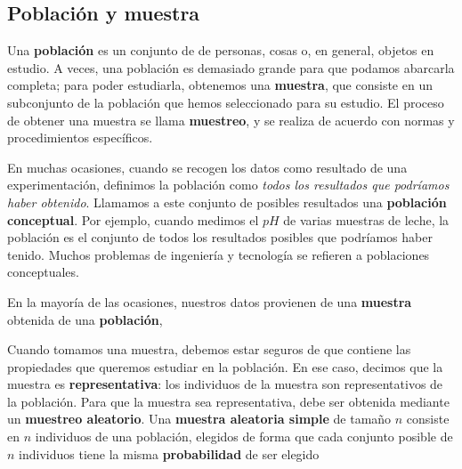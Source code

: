 \documentclass[
  letterpaper,
  DIV=11,
  numbers=noendperiod,
  oneside]{scrreprt}
\begin{document}
\hypertarget{poblaciuxf3n-y-muestra}{%
\subsection{Población y muestra}\label{poblaciuxf3n-y-muestra}}

Una \textbf{población} es un conjunto de de personas, cosas o, en
general, objetos en estudio. A veces, una población es demasiado grande
para que podamos abarcarla completa; para poder estudiarla, obtenemos
una \textbf{muestra}, que consiste en un subconjunto de la población que
hemos seleccionado para su estudio. El proceso de obtener una muestra se
llama \textbf{muestreo}, y se realiza de acuerdo con normas y
procedimientos específicos.

En muchas ocasiones, cuando se recogen los datos como resultado de una
experimentación, definimos la población como \emph{todos los resultados
que podríamos haber obtenido}. Llamamos a este conjunto de posibles
resultados una \textbf{población conceptual}. Por ejemplo, cuando
medimos el \(pH\) de varias muestras de leche, la población es el
conjunto de todos los resultados posibles que podríamos haber tenido.
Muchos problemas de ingeniería y tecnología se refieren a poblaciones
conceptuales.

\begin{tcolorbox}[enhanced jigsaw, colback=white, opacitybacktitle=0.6, leftrule=.75mm, opacityback=0, coltitle=black, colframe=quarto-callout-important-color-frame, colbacktitle=quarto-callout-important-color!10!white, bottomrule=.15mm, title=\textcolor{quarto-callout-important-color}{\faExclamation}\hspace{0.5em}{Recuerda}, bottomtitle=1mm, toptitle=1mm, breakable, left=2mm, arc=.35mm, titlerule=0mm, rightrule=.15mm, toprule=.15mm]

En la mayoría de las ocasiones, nuestros datos provienen de una
\textbf{muestra} obtenida de una \textbf{población},

\end{tcolorbox}

Cuando tomamos una muestra, debemos estar seguros de que contiene las
propiedades que queremos estudiar en la población. En ese caso, decimos
que la muestra es \textbf{representativa}: los individuos de la muestra
son representativos de la población. Para que la muestra sea
representativa, debe ser obtenida mediante un \textbf{muestreo
aleatorio}. Una \textbf{muestra aleatoria simple} de tamaño \(n\)
consiste en \(n\) individuos de una población, elegidos de forma que
cada conjunto posible de \(n\) individuos tiene la misma
\textbf{probabilidad} de ser elegido
\end{document}
